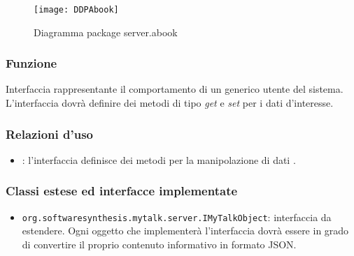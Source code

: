 \begin{figure}[H]
  \texttt{[image: DDPAbook]}
\caption{Diagramma package server.abook}
\end{figure}


\subsubsection*{Funzione}
Interfaccia rappresentante il comportamento di un generico utente del sistema. L'interfaccia dovrà definire dei metodi di tipo \textit{get} e \textit{set} per i dati d'interesse.

\subsubsection*{Relazioni d'uso}

\begin{itemize}
	\item {}: l'interfaccia definisce dei metodi per la manipolazione di dati .
\end{itemize}

\subsubsection*{Classi estese ed interfacce implementate}
\begin{itemize}
	\item \texttt{org.softwaresynthesis.mytalk.server.IMyTalkObject}: interfaccia da estendere. Ogni oggetto che implementerà l'interfaccia  dovrà essere in grado di convertire il proprio contenuto informativo in formato JSON.
\end{itemize}


